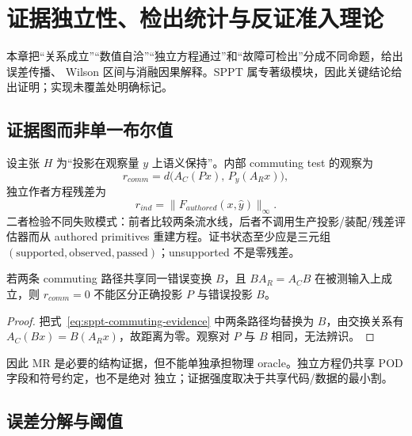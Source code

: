 \section{证据独立性、检出统计与反证准入理论}

\begin{theorynote}
本章把“关系成立”“数值自洽”“独立方程通过”和“故障可检出”分成不同命题，给出误差传播、
Wilson 区间与消融因果解释。SPPT 属专著级模块，因此关键结论给出证明；实现未覆盖处明确标记。
\end{theorynote}

\subsection{证据图而非单一布尔值}

设主张 $H$ 为“投影在观察量 $y$ 上语义保持”。内部 commuting test 的观察为
\begin{equation}
 r_{comm}=d\bigl(A_C(Px),\,P_y(A_Rx)\bigr),
 \label{eq:sppt-commuting-evidence}
\end{equation}
独立作者方程残差为
\begin{equation}
 r_{ind}=\|F_{authored}(x,\hat y)\|_\infty.
 \label{eq:sppt-independent-evidence}
\end{equation}
二者检验不同失败模式：前者比较两条流水线，后者不调用生产投影/装配/残差评估器而从 authored primitives
重建方程。证书状态至少应是三元组
$(\text{supported},\text{observed},\text{passed})$；unsupported 不是零残差。

\begin{theorem}[共同错误的不可辨识性]
若两条 commuting 路径共享同一错误变换 $B$，且 $BA_R=A_CB$ 在被测输入上成立，则
$r_{comm}=0$ 不能区分正确投影 $P$ 与错误投影 $B$。
\end{theorem}
\begin{proof}
把式~\eqref{eq:sppt-commuting-evidence} 中两条路径均替换为 $B$，由交换关系有
$A_C(Bx)=B(A_Rx)$，故距离为零。观察对 $P$ 与 $B$ 相同，无法辨识。
\end{proof}

因此 MR 是必要的结构证据，但不能单独承担物理 oracle。独立方程仍共享 POD 字段和符号约定，也不是绝对
独立；证据强度取决于共享代码/数据的最小割。

\subsection{误差分解与阈值}


